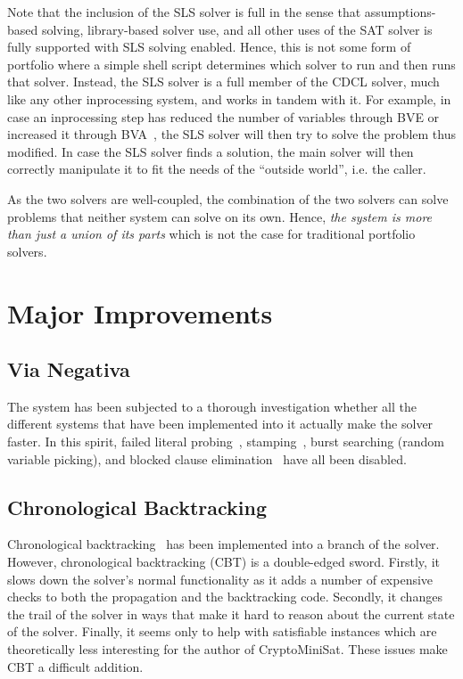 \documentclass[final]{ieee}
\begin{document}
Note that the inclusion of the SLS solver is full in the sense that assumptions-based solving, library-based solver use, and all other uses of the SAT solver is fully supported with SLS solving enabled. Hence, this is not some form of portfolio where a simple shell script determines which solver to run and then runs that solver. Instead, the SLS solver is a full member of the CDCL solver, much like any other inprocessing system, and works in tandem with it. For example, in case an inprocessing step has reduced the number of variables through BVE or increased it through BVA~\cite{BVA}, the SLS solver will then try to solve the problem thus modified. In case the SLS solver finds a solution, the main solver will then correctly manipulate it to fit the needs of the ``outside world'', i.e. the caller.

As the two solvers are well-coupled, the combination of the two solvers can solve problems that neither system can solve on its own. Hence, \emph{the system is more than just a union of its parts} which is not the case for traditional portfolio solvers.

\section{Major Improvements}
\subsection{Via Negativa}
The system has been subjected to a thorough investigation whether all the different systems that have been implemented into it actually make the solver faster. In this spirit, failed literal probing~\cite{DBLP:conf/ictai/LynceS03}, stamping~\cite{stamping}, burst searching (random variable picking), and blocked clause elimination~\cite{TACAS-2010-JarvisaloBH} have all been disabled.

\subsection{Chronological Backtracking}
Chronological backtracking~\cite{chronobt} has been implemented into a branch of the solver. However, chronological backtracking (CBT) is a double-edged sword. Firstly, it slows down the solver's normal functionality as it adds a number of expensive checks to both the propagation and the backtracking code. Secondly, it changes the trail of the solver in ways that make it hard to reason about the current state of the solver. Finally, it seems only to help with satisfiable instances which are theoretically less interesting for the author of CryptoMiniSat. These issues make CBT a difficult addition.
\end{document}
